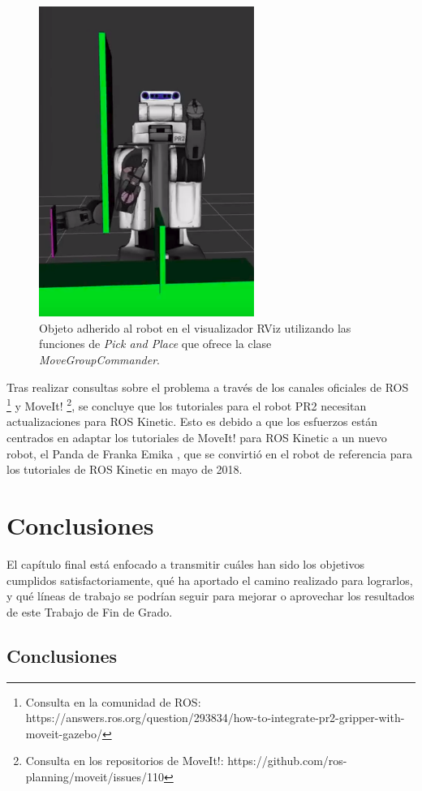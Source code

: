 \documentclass[12pt,spanish,chapterprefix, numbers=noenddot]{book}
\numberwithin{equation}{section}
\numberwithin{figure}{section}
\begin{document}
\begin{figure}[hbt!]
\centering
\includegraphics[width=7cm]{Figs/pick.png}
\par
\caption{\label{fig:pick}Objeto adherido al robot en el visualizador RViz utilizando las funciones de \textit{Pick and Place} que ofrece la clase \textit{MoveGroupCommander}.}
\end{figure}

Tras realizar consultas sobre el problema a través de los canales oficiales de ROS \footnote{Consulta en la comunidad de ROS: https://answers.ros.org/question/293834/how-to-integrate-pr2-gripper-with-moveit-gazebo/} y MoveIt! \footnote{Consulta en los repositorios de MoveIt!: https://github.com/ros-planning/moveit/issues/110}, se concluye que los tutoriales para el robot PR2 necesitan actualizaciones para ROS Kinetic. Esto es debido a que los esfuerzos están centrados en adaptar los tutoriales de MoveIt! para ROS Kinetic a un nuevo robot, el Panda de Franka Emika \cite{emika}, que se convirtió en el robot de referencia para los tutoriales de ROS Kinetic en mayo de 2018. 

\chapter{Conclusiones}
El capítulo final está enfocado a transmitir cuáles han sido los objetivos cumplidos satisfactoriamente, qué ha aportado el camino realizado para lograrlos, y qué líneas de trabajo se podrían seguir para mejorar o aprovechar los resultados de este Trabajo de Fin de Grado.  
\section{Conclusiones}
\end{document}
